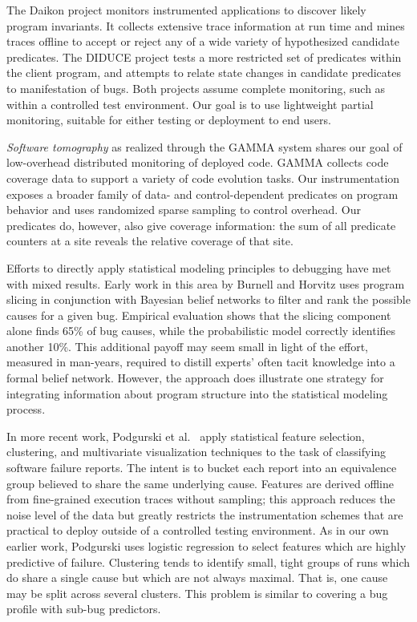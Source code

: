 \documentclass[preprint,final]{sigplanconf}
\newcommand{\termdef}[1]{\emph{#1}}
\begin{document}
The Daikon project \cite{ernst2001} monitors instrumented applications
to discover likely program invariants.  It collects extensive trace
information at run time and mines traces offline to accept or reject any
of a wide variety of hypothesized candidate predicates.  The DIDUCE project
\cite{ICSE02*291} tests a more restricted set of predicates within the
client program, and attempts to relate state changes in candidate
predicates to manifestation of bugs.  Both projects assume complete
monitoring, such as within a controlled test environment.  Our goal is
to use lightweight partial monitoring, suitable for either testing
or deployment to end users.  

\termdef{Software tomography} as realized through the GAMMA system
\cite{PASTE'02*2,Orso:2003:LFDIART} shares our goal of low-overhead
distributed monitoring of deployed code.  GAMMA collects code coverage
data to support a variety of code evolution tasks.  Our
instrumentation exposes a broader family of data- and
control-dependent predicates on program behavior and uses randomized
sparse sampling to control overhead.  Our predicates do,
however, also give coverage information: the sum of all predicate counters at a site reveals the relative coverage of that site.

Efforts to directly apply statistical modeling principles to debugging
have met with mixed results.  Early work in this area by Burnell and
Horvitz \cite{Burnell:1995:SCM} uses program slicing in conjunction
with Bayesian belief networks to filter and rank the possible causes
for a given bug.  Empirical evaluation shows that the slicing
component alone finds 65\% of bug causes, while the probabilistic
model correctly identifies another 10\%.  This additional payoff may
seem small in light of the effort, measured in man-years, required to
distill experts' often tacit knowledge into a formal belief network.
However, the approach does illustrate one strategy for integrating
information about program structure into the statistical modeling
process.

In more recent work, Podgurski et al.\ \cite{ICSE`03*465} apply
statistical feature selection, clustering, and multivariate
visualization techniques to the task of classifying software failure
reports.  The intent is to bucket each report into an equivalence
group believed to share the same underlying cause.  Features are
derived offline from fine-grained execution traces without sampling;
this approach reduces the noise level of the data but greatly restricts the
instrumentation schemes that are practical to deploy outside of a
controlled testing environment.  As in our own earlier work, Podgurski
uses logistic regression to select features which are highly
predictive of failure.
Clustering tends to identify small, tight groups of runs which do
share a single cause but which are not always maximal.  That is, one
cause may be split across several clusters.  This problem is similar
to covering a bug profile with sub-bug predictors.
\end{document}
